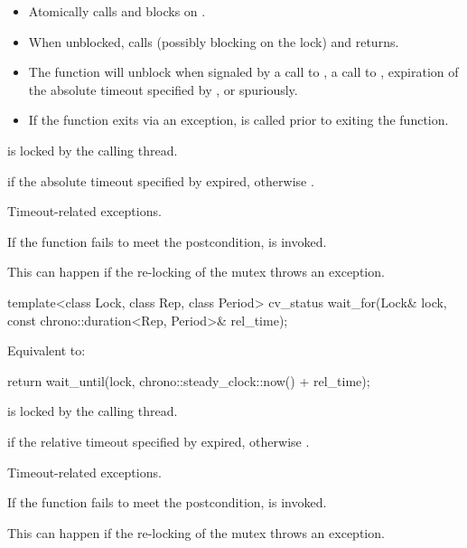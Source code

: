 \begin{itemdescr}
\pnum
\effects

\begin{itemize}
\item
{}%
Atomically calls  and blocks on .

\item
When unblocked, calls  (possibly blocking on the lock) and returns.

\item
The function will unblock when signaled by a call to , a call to ,
expiration of the absolute timeout specified by ,
or spuriously.

\item
If the function exits via an exception,  is called prior to exiting the function.
\end{itemize}

\pnum
\ensures
{} is locked by the calling thread.

\pnum
\returns
{} if
the absolute timeout specified by  expired,
otherwise .

\pnum
\throws
Timeout-related
exceptions.

\pnum
\remarks
If the function fails to meet the postcondition, 
is invoked.
\begin{note}
This can happen if the re-locking of the mutex throws an exception.
\end{note}
\end{itemdescr}

%
\begin{itemdecl}
template<class Lock, class Rep, class Period>
  cv_status wait_for(Lock& lock, const chrono::duration<Rep, Period>& rel_time);
\end{itemdecl}

\begin{itemdescr}
\pnum
\effects
Equivalent to:
\begin{codeblock}
return wait_until(lock, chrono::steady_clock::now() + rel_time);
\end{codeblock}

\pnum
\ensures
{} is locked by the calling thread.

\pnum
\returns
{} if
the relative timeout specified by  expired,
otherwise .

\pnum
\throws
Timeout-related
exceptions.

\pnum
\remarks
If the function fails to meet the postcondition, 
is invoked.
\begin{note}
This can happen if the re-locking of the mutex throws an exception.
\end{note}
\end{itemdescr}

